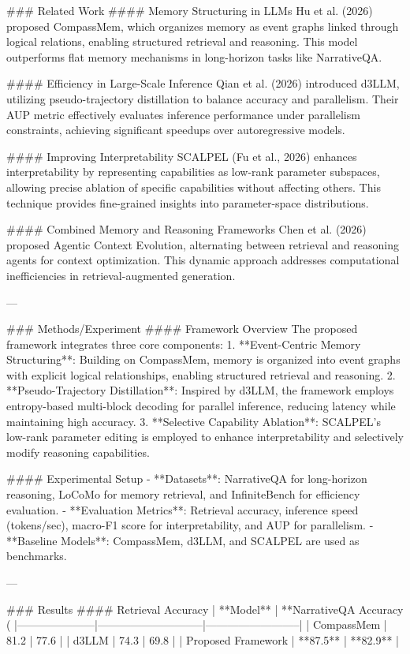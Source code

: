 ### Related Work
#### Memory Structuring in LLMs
Hu et al. (2026) proposed CompassMem, which organizes memory as event graphs linked through logical relations, enabling structured retrieval and reasoning. This model outperforms flat memory mechanisms in long-horizon tasks like NarrativeQA.

#### Efficiency in Large-Scale Inference
Qian et al. (2026) introduced d3LLM, utilizing pseudo-trajectory distillation to balance accuracy and parallelism. Their AUP metric effectively evaluates inference performance under parallelism constraints, achieving significant speedups over autoregressive models.

#### Improving Interpretability
SCALPEL (Fu et al., 2026) enhances interpretability by representing capabilities as low-rank parameter subspaces, allowing precise ablation of specific capabilities without affecting others. This technique provides fine-grained insights into parameter-space distributions.

#### Combined Memory and Reasoning Frameworks
Chen et al. (2026) proposed Agentic Context Evolution, alternating between retrieval and reasoning agents for context optimization. This dynamic approach addresses computational inefficiencies in retrieval-augmented generation.

---

### Methods/Experiment
#### Framework Overview
The proposed framework integrates three core components:
1. **Event-Centric Memory Structuring**: Building on CompassMem, memory is organized into event graphs with explicit logical relationships, enabling structured retrieval and reasoning.
2. **Pseudo-Trajectory Distillation**: Inspired by d3LLM, the framework employs entropy-based multi-block decoding for parallel inference, reducing latency while maintaining high accuracy.
3. **Selective Capability Ablation**: SCALPEL's low-rank parameter editing is employed to enhance interpretability and selectively modify reasoning capabilities.

#### Experimental Setup
- **Datasets**: NarrativeQA for long-horizon reasoning, LoCoMo for memory retrieval, and InfiniteBench for efficiency evaluation.
- **Evaluation Metrics**: Retrieval accuracy, inference speed (tokens/sec), macro-F1 score for interpretability, and AUP for parallelism.
- **Baseline Models**: CompassMem, d3LLM, and SCALPEL are used as benchmarks.

---

### Results
#### Retrieval Accuracy
| **Model**          | **NarrativeQA Accuracy (%
|---------------------|-----------------------------|--------------------------|
| CompassMem          | 81.2                        | 77.6                     |
| d3LLM               | 74.3                        | 69.8                     |
| Proposed Framework  | **87.5**                    | **82.9**                 |

